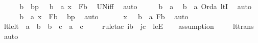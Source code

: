 \begin{isabellebody}
\ \ \isamarkupfalse%
\ \isamarkupfalse%
\ b\ \ bp\ {\isacharcolon}{\kern0pt}\ \ {\isachardoublequoteopen}b\ {\isasymin}\ a{\isachardoublequoteclose}\ {\isachardoublequoteopen}x\ {\isasymin}\ F{\isacharparenleft}{\kern0pt}b{\isacharparenright}{\kern0pt}{\isachardoublequoteclose}\ \isamarkupfalse%
\ UN{\isacharunderscore}{\kern0pt}iff\ \isamarkupfalse%
\ auto\isanewline
\ \ \isamarkupfalse%
\ \isamarkupfalse%
\ {\isachardoublequoteopen}b\ {\isacharless}{\kern0pt}\ a{\isachardoublequoteclose}\ \isamarkupfalse%
\ {\isacartoucheopen}b\ {\isasymin}\ a{\isacartoucheclose}\ {\isacartoucheopen}Ord{\isacharparenleft}{\kern0pt}a{\isacharparenright}{\kern0pt}{\isacartoucheclose}\ ltI\ \isamarkupfalse%
\ auto\ \isanewline
\ \ \isamarkupfalse%
\ \isamarkupfalse%
\ {\isachardoublequoteopen}{\isasymexists}b\ {\isacharless}{\kern0pt}\ a{\isachardot}{\kern0pt}\ x\ {\isasymin}\ F{\isacharparenleft}{\kern0pt}b{\isacharparenright}{\kern0pt}{\isachardoublequoteclose}\ \isamarkupfalse%
\ bp\ \isamarkupfalse%
\ auto\ \isanewline
\ \ \isamarkupfalse%
\ \isamarkupfalse%
\ {\isachardoublequoteopen}x\ {\isasymin}\ {\isacharparenleft}{\kern0pt}{\isasymUnion}\ b\ {\isacharless}{\kern0pt}\ a{\isachardot}{\kern0pt}\ F{\isacharparenleft}{\kern0pt}b{\isacharparenright}{\kern0pt}{\isacharparenright}{\kern0pt}{\isachardoublequoteclose}\ \isamarkupfalse%
\ auto\ \isanewline
{}\isamarkupfalse%
%
\endisatagproof
{\isafoldproof}%
%
\isadelimproof
\isanewline
%
\endisadelimproof
\isanewline
{}\isamarkupfalse%
\ lt{\isacharunderscore}{\kern0pt}le{\isacharunderscore}{\kern0pt}lt\ {\isacharcolon}{\kern0pt}\ {\isachardoublequoteopen}a\ {\isacharless}{\kern0pt}\ b\ {\isasymLongrightarrow}\ b\ {\isasymle}\ c\ {\isasymLongrightarrow}\ a\ {\isacharless}{\kern0pt}\ c{\isachardoublequoteclose}\ \isanewline
%
\isadelimproof
\ \ %
\endisadelimproof
%
\isatagproof
{}\isamarkupfalse%
\ {\isacharparenleft}{\kern0pt}rule{\isacharunderscore}{\kern0pt}tac\ i{\isacharequal}{\kern0pt}b\ \ j{\isacharequal}{\kern0pt}c\ \ leE{\isacharparenright}{\kern0pt}\isanewline
\ \ \isamarkupfalse%
\ assumption\ \isanewline
\ \ \isamarkupfalse%
\ lt{\isacharunderscore}{\kern0pt}trans\ \isamarkupfalse%
\ auto%
\endisatagproof
{\isafoldproof}%

\end{isabellebody}
